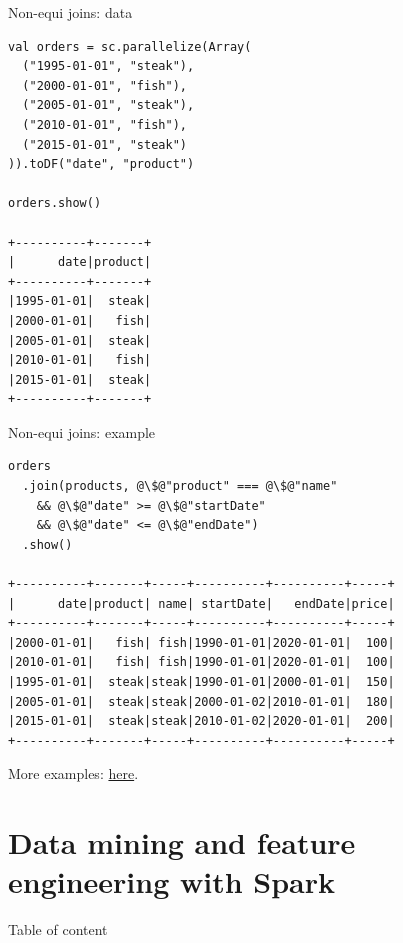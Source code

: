 \documentclass[unicode, notheorems]{beamer}
\begin{document}
\begin{frame}[fragile]{Non-equi joins: data}

{\footnotesize
\begin{verbatim}
val orders = sc.parallelize(Array(
  ("1995-01-01", "steak"),
  ("2000-01-01", "fish"),
  ("2005-01-01", "steak"),
  ("2010-01-01", "fish"),
  ("2015-01-01", "steak")
)).toDF("date", "product")

orders.show()

+----------+-------+
|      date|product|
+----------+-------+
|1995-01-01|  steak|
|2000-01-01|   fish|
|2005-01-01|  steak|
|2010-01-01|   fish|
|2015-01-01|  steak|
+----------+-------+
\end{verbatim}
}
\end{frame}


\begin{frame}[fragile]{Non-equi joins: example}

{\footnotesize
\begin{verbatim}
orders
  .join(products, @\$@"product" === @\$@"name"
    && @\$@"date" >= @\$@"startDate" 
    && @\$@"date" <= @\$@"endDate")
  .show()

+----------+-------+-----+----------+----------+-----+
|      date|product| name| startDate|   endDate|price|
+----------+-------+-----+----------+----------+-----+
|2000-01-01|   fish| fish|1990-01-01|2020-01-01|  100|
|2010-01-01|   fish| fish|1990-01-01|2020-01-01|  100|
|1995-01-01|  steak|steak|1990-01-01|2000-01-01|  150|
|2005-01-01|  steak|steak|2000-01-02|2010-01-01|  180|
|2015-01-01|  steak|steak|2010-01-02|2020-01-01|  200|
+----------+-------+-----+----------+----------+-----+
\end{verbatim}
}

\vfill
{\small
More examples: \href{http://kirillpavlov.com/blog/2016/04/23/beyond-traditional-join-with-apache-spark/}{here}.
}
\end{frame}


\section{Data mining and feature engineering with Spark}
\begin{frame}{Table of content}
\tableofcontents[currentsection]
\end{frame}
\end{document}
